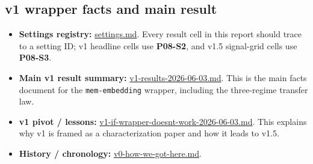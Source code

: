 \documentclass[11pt]{article}
\newcommand{\code}[1]{\texttt{#1}}
\begin{document}
\subsection{v1 wrapper facts and main result}
\begin{itemize}
\item \textbf{Settings registry:}
\href{https://github.com/BDeMo/research-notes/blob/main/notes/plans/08-model-outputs-delta-w/settings/settings.md}{settings.md}.
Every result cell in this report should trace to a setting ID; v1
headline cells use \textbf{P08-S2}, and v1.5 signal-grid cells use
\textbf{P08-S3}.
\item \textbf{Main v1 result summary:}
\href{https://github.com/BDeMo/research-notes/blob/main/notes/plans/08-model-outputs-delta-w/v1-results-2026-06-03.md}{v1-results-2026-06-03.md}.
This is the main facts document for the \code{mem-embedding} wrapper,
including the three-regime transfer law.
\item \textbf{v1 pivot / lessons:}
\href{https://github.com/BDeMo/research-notes/blob/main/notes/plans/08-model-outputs-delta-w/v1-if-wrapper-doesnt-work-2026-06-03.md}{v1-if-wrapper-doesnt-work-2026-06-03.md}.
This explains why v1 is framed as a characterization paper and how it
leads to v1.5.
\item \textbf{History / chronology:}
\href{https://github.com/BDeMo/research-notes/blob/main/notes/plans/08-model-outputs-delta-w/v0-how-we-got-here.md}{v0-how-we-got-here.md}.
\end{itemize}
\end{document}
